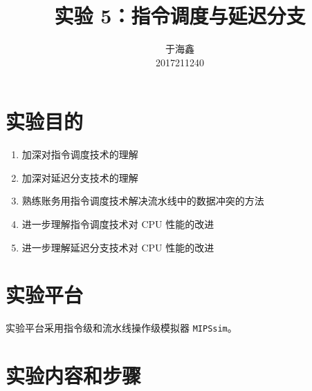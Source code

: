 \documentclass[blue,normal,cn]{elegantnote}
\title{实验 5：指令调度与延迟分支}
\date{\zhtoday}
\newcommand{\code}[1]{\colorbox{light-gray}{\texttt{#1}}}
\begin{document}
\author{
    \begin{tabular}[t]{c}
        于海鑫 \\
        2017211240
    \end{tabular}
}
\maketitle

\section{实验目的}
\begin{enumerate}
    \item 加深对指令调度技术的理解
    \item 加深对延迟分支技术的理解
    \item 熟练账务用指令调度技术解决流水线中的数据冲突的方法
    \item 进一步理解指令调度技术对 CPU 性能的改进
    \item 进一步理解延迟分支技术对 CPU 性能的改进
\end{enumerate}

\section{实验平台}

实验平台采用指令级和流水线操作级模拟器 \code{MIPSsim}。

\section{实验内容和步骤}
\end{document}
